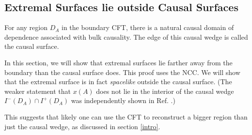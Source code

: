 \documentclass[12pt]{article}
\begin{document}
\subsection{Extremal Surfaces lie outside Causal Surfaces}\label{causal}

For any region $D_A$ in the boundary CFT, there is a natural causal domain of dependence associated with bulk causality.  The edge of this causal wedge is called the causal surface.

In this section, we will show that extremal surfaces lie farther away from the boundary than the causal surface does.  This proof uses the NCC.  We will show that the extremal surface is in fact \emph{spacelike} outside the causal surface.  (The weaker statement that $x(A)$ does not lie in the interior of the causal wedge $I^-(D_A) \cap I^+(D_A)$ was independently shown in Ref. \cite{HR12}.)

This suggests that likely one can use the CFT to reconstruct a bigger region than just the causal wedge, as discussed in section \ref{intro}.
\end{document}
